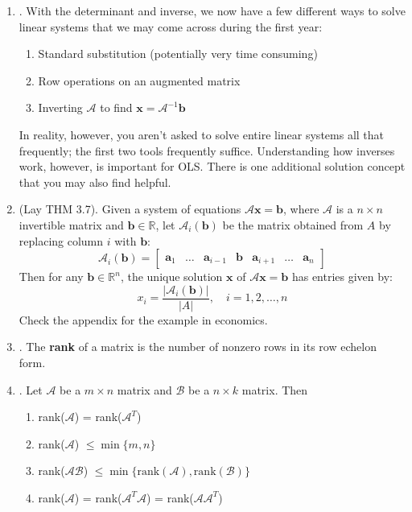 \documentclass[12pt]{article}
\begin{document}
\begin{enumerate}
\begin{enumerate}
	\item\underline{}.
		With the determinant and inverse, we now have a few different ways to solve linear systems that we may come
		across during the first year:
		\begin{enumerate}
		\item Standard substitution (potentially very time consuming)
		\item Row operations on an augmented matrix
		\item Inverting $\mathcal{A}$ to find $\mathbf{x}= \mathcal{A}^{-1}\mathbf{b}$
		\end{enumerate}
		In reality, however, you aren't asked to solve entire linear systems all that frequently; the first two
		tools frequently suffice. Understanding how inverses work, however, is important for OLS. There is one
		additional solution concept that you may also find helpful.

	\item\underline{} (Lay THM 3.7).
		Given a system of equations $\mathcal{A}\mathbf{x}=\mathbf{b}$, where $\mathcal{A}$ is a $n\times n$ invertible matrix and $\mathbf{b}\in\mathbb{R}$,
		let $\mathcal{A}_i(\mathbf{b})$ be the matrix obtained from $A$ by replacing column $i$ with $\mathbf{b}$:
			\[\mathcal{A}_i(\mathbf{b})=\begin{bmatrix}\mathbf{a}_1&\dots&\mathbf{a}_{i-1}&\mathbf{b}&\mathbf{a}_{i+1}&\dots&\mathbf{a}_n\end{bmatrix}\]
		Then for any $\mathbf{b}\in\mathbb{R}^n$, the unique solution $\mathbf{x}$ of $\mathcal{A}\mathbf{x}=\mathbf{b}$ has entries given by:
			\[x_i = \frac{|\mathcal{A}_i(\mathbf{b})|}{|A|},\quad i=1,2,\dots,n\]
		Check the appendix for the example in economics.
	
	\item\underline{}. The \textbf{rank} of a matrix is the number of nonzero rows in its row echelon form. 
	
	\item\underline{}. Let $\mathcal{A}$ be a $m\times n$ matrix and $\mathcal{B}$ be a $n \times k$ matrix. Then
	\begin{enumerate}
		\item rank($\mathcal{A}$) = rank($\mathcal{A}^T$)
		\item rank($\mathcal{A}$) $\leq \min \{m,n\}$
		\item rank($\mathcal{AB}$) $\leq \min \{\text{rank}(\mathcal{A}), \text{rank}(\mathcal{B}) \}$
		\item rank($\mathcal{A}$) = rank($\mathcal{A}^T\mathcal{A}$) = rank($\mathcal{AA}^T$)
	\end{enumerate}


\end{enumerate}
\end{enumerate}
\end{document}
